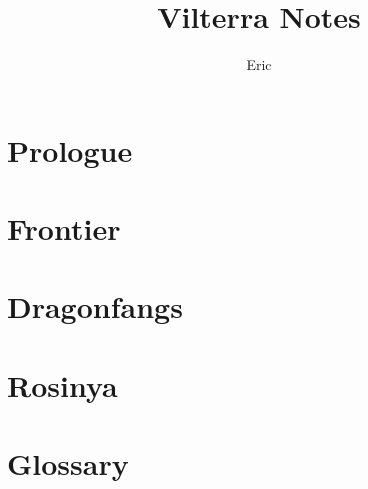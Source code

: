 \documentclass[10pt,twoside,twocolumn,openany,nodeprecatedcode]{dndbook}
\title{Vilterra Notes}
\author{Eric}
\begin{document}
\maketitle

\setcounter{chapter}{-1}
\chapter{Prologue}%
\label{cha:Vilterra}


\chapter{Frontier}%
\label{cha:Frontier}



\chapter{Dragonfangs}%
\label{cha:Dragonfangs}



\chapter{Rosinya}%
\label{cha:Rosinya}



\chapter{Glossary}%
\label{cha:Glossary}


\end{document}
